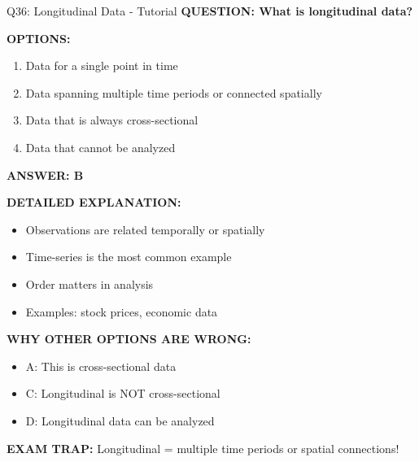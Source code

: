 \documentclass[8pt]{beamer}
\begin{document}
	\begin{frame}{Q36: Longitudinal Data - Tutorial}
		\fontsize{6.5}{7.5}\selectfont
		\textbf{QUESTION: What is longitudinal data?}
		
		\vspace{0.1cm}
		\textbf{OPTIONS:}
		\begin{enumerate}
			\item Data for a single point in time
			\item Data spanning multiple time periods or connected spatially
			\item Data that is always cross-sectional
			\item Data that cannot be analyzed
		\end{enumerate}
		
		\vspace{0.1cm}
		\textcolor{myblue}{\textbf{ANSWER: B}}
		
		\vspace{0.1cm}
		\textbf{DETAILED EXPLANATION:}
		\begin{itemize}
			\item Observations are related temporally or spatially
			\item Time-series is the most common example
			\item Order matters in analysis
			\item Examples: stock prices, economic data
		\end{itemize}
		
		\vspace{0.1cm}
		\textcolor{myred}{\textbf{WHY OTHER OPTIONS ARE WRONG:}}
		\begin{itemize}
			\item \textcolor{myred}{A:} This is cross-sectional data
			\item \textcolor{myred}{C:} Longitudinal is NOT cross-sectional
			\item \textcolor{myred}{D:} Longitudinal data can be analyzed
		\end{itemize}
		
		\textcolor{myred}{\textbf{EXAM TRAP:}} Longitudinal = \textcolor{myblue}{multiple time periods or spatial connections}!
	\end{frame}
	
\end{document}
